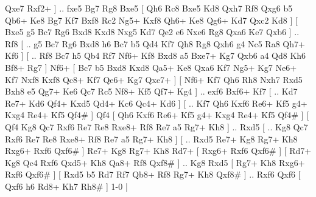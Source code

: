 Qxe7 Rxf2+   ] .. fxe5    Bg7   Rg8    Bxe5 [  Qh6 Rc8  Bxe5 Kd8  Qxh7 Rf8  Qxg6 b5  Qb6+ Ke8  Bg7 Kf7  Bxf8 Rc2  Ng5+ Kxf8  Qh6+ Ke8  Qg6+ Kd7  Qxc2 Kd8   ]  [  Bxe5 g5  Bc7 Rg6  Bxd8 Kxd8  Nxg5 Kd7  Qe2 e6  Nxe6 Rg8  Qxa6 Ke7  Qxb6   ] .. Rf8 [ .. g5  Bc7 Rg6  Bxd8 h6  Bc7 b5  Qd4 Kf7  Qh8 Rg8  Qxh6 g4  Nc5 Ra8  Qh7+ Kf6   ]  [ .. Rf8  Bc7 h5  Qb4 Rf7  Nf6+ Kf8  Bxd8 a5  Bxe7+ Kg7  Qxb6 a4  Qd8 Kh6  Bf8+ Rg7   ]  Nf6+ [  Bc7 b5  Bxd8 Kxd8  Qa5+ Ke8  Qxa6 Kf7  Ng5+ Kg7  Ne6+ Kf7  Nxf8 Kxf8  Qc8+ Kf7  Qe6+ Kg7  Qxe7+   ]  [  Nf6+ Kf7  Qh6 Rh8  Nxh7 Rxd5  Bxh8 e5  Qg7+ Ke6  Qc7 Rc5  Nf8+ Kf5  Qf7+ Kg4   ] .. exf6    Bxf6+   Kf7 [ .. Kd7  Re7+ Kd6  Qf4+ Kxd5  Qd4+ Kc6  Qc4+ Kd6   ]  [ .. Kf7  Qh6 Kxf6  Re6+ Kf5  g4+ Kxg4  Re4+ Kf5  Qf4#   ]  Qf4    [  Qh6 Kxf6  Re6+ Kf5  g4+ Kxg4  Re4+ Kf5  Qf4#   ]  [  Qf4 Kg8  Qc7 Rxf6  Re7 Re8  Rxe8+ Rf8  Re7 a5  Rg7+ Kh8   ] .. Rxd5 [ .. Kg8  Qc7 Rxf6  Re7 Re8  Rxe8+ Rf8  Re7 a5  Rg7+ Kh8   ]  [ .. Rxd5  Re7+ Kg8  Rg7+ Kh8  Rxg6+ Rxf6  Qxf6#   ]  Re7+   Kg8   Rg7+   Kh8   Rd7+ [  Rxg6+ Rxf6  Qxf6#   ]  [  Rd7+ Kg8  Qc4 Rxf6  Qxd5+ Kh8  Qa8+ Rf8  Qxf8#   ] .. Kg8    Rxd5 [  Rg7+ Kh8  Rxg6+ Rxf6  Qxf6#   ]  [  Rxd5 b5  Rd7 Rf7  Qb8+ Rf8  Rg7+ Kh8  Qxf8#   ] .. Rxf6    Qxf6    [  Qxf6 h6  Rd8+ Kh7  Rh8#   ] 1-0  |
